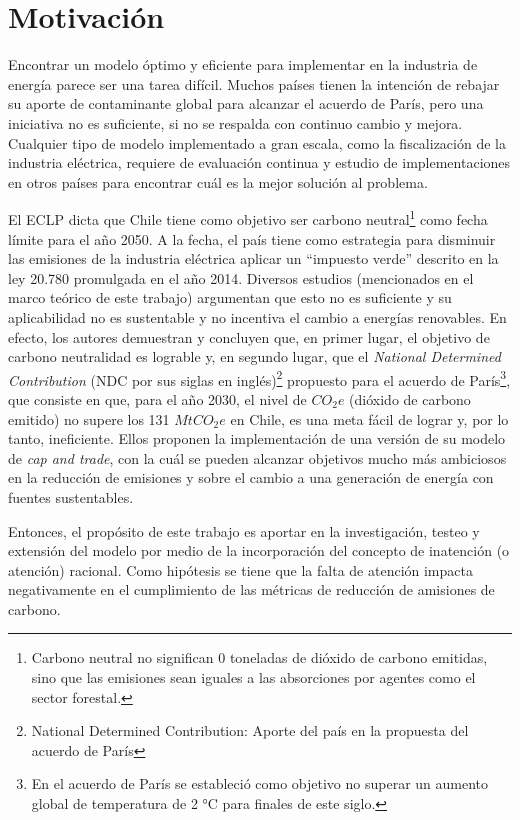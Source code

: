 \section{Motivación}
Encontrar un modelo óptimo y eficiente para implementar en la industria de energía parece ser una tarea difícil. Muchos países tienen la intención de rebajar su aporte de contaminante global para alcanzar el acuerdo de París, pero una iniciativa no es suficiente, si no se respalda con continuo cambio y mejora. Cualquier tipo de modelo implementado a gran escala, como la fiscalización de la industria eléctrica, requiere de evaluación continua y estudio de implementaciones en otros países para encontrar cuál es la mejor solución al problema.
\vspace{2.5mm}

El ECLP dicta que Chile tiene como objetivo ser carbono neutral\footnote{Carbono neutral no significan 0 toneladas de dióxido de carbono emitidas, sino que las emisiones sean iguales a las absorciones por agentes como el sector forestal.} como fecha límite para el año 2050. A la fecha, el país tiene como estrategia para disminuir las emisiones de la industria eléctrica aplicar un ``impuesto verde'' descrito en la ley 20.780 promulgada en el año 2014. Diversos estudios (mencionados en el marco teórico de este trabajo) argumentan que esto no es suficiente y su aplicabilidad no es sustentable y no incentiva el cambio a energías renovables. En efecto, los autores  demuestran y concluyen que, en primer lugar, el objetivo de carbono neutralidad es lograble y, en segundo lugar, que el \emph{National Determined Contribution}  (NDC por sus siglas en inglés)\footnote{National Determined Contribution: Aporte del país en la propuesta del acuerdo de París}  propuesto para el acuerdo de París\footnote{En el acuerdo de París se estableció como objetivo no superar un aumento global de temperatura de 2 °C para finales de este siglo.}, que consiste en que, para el año 2030, el nivel de $CO_2 e$ (dióxido de carbono emitido) no supere los 131 $MtCO_2 e$ en Chile, es una meta fácil de lograr y, por lo tanto, ineficiente. Ellos proponen la implementación de una versión de su modelo de \emph{cap and trade}, con la cuál se pueden alcanzar objetivos mucho más ambiciosos en la reducción de emisiones y sobre el cambio a una generación de energía con fuentes sustentables.
\vspace{2.5mm}

Entonces, el propósito de este trabajo es aportar en la investigación, testeo y extensión del modelo por medio de la incorporación del concepto de inatención (o atención) racional. Como hipótesis se tiene que la falta de atención impacta negativamente en el cumplimiento de las métricas de reducción de amisiones de carbono.
\vspace{2.5mm}

